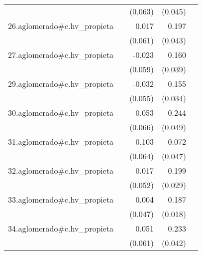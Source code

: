 {\begin{longtable}{l*{4}{D{.}{.}{-1}}}
            &                     &     (0.063)         &     (0.045)         &                     \\
\addlinespace
26.aglomerado#c.hv\_propieta&                     &       0.017         &       0.197\sym{***}&                     \\
            &                     &     (0.061)         &     (0.043)         &                     \\
\addlinespace
27.aglomerado#c.hv\_propieta&                     &      -0.023         &       0.160\sym{***}&                     \\
            &                     &     (0.059)         &     (0.039)         &                     \\
\addlinespace
29.aglomerado#c.hv\_propieta&                     &      -0.032         &       0.155\sym{***}&                     \\
            &                     &     (0.055)         &     (0.034)         &                     \\
\addlinespace
30.aglomerado#c.hv\_propieta&                     &       0.053         &       0.244\sym{***}&                     \\
            &                     &     (0.066)         &     (0.049)         &                     \\
\addlinespace
31.aglomerado#c.hv\_propieta&                     &      -0.103         &       0.072         &                     \\
            &                     &     (0.064)         &     (0.047)         &                     \\
\addlinespace
32.aglomerado#c.hv\_propieta&                     &       0.017         &       0.199\sym{***}&                     \\
            &                     &     (0.052)         &     (0.029)         &                     \\
\addlinespace
33.aglomerado#c.hv\_propieta&                     &       0.004         &       0.187\sym{***}&                     \\
            &                     &     (0.047)         &     (0.018)         &                     \\
\addlinespace
34.aglomerado#c.hv\_propieta&                     &       0.051         &       0.233\sym{***}&                     \\
            &                     &     (0.061)         &     (0.042)         &                     \\

\end{longtable}}
